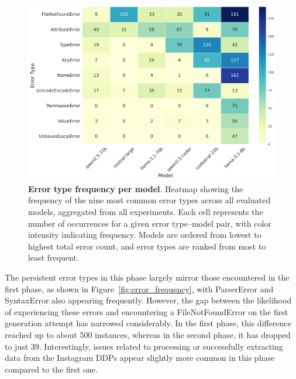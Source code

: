 \documentclass{DESSThesis}
\begin{document}
\begin{figure}[ht]
    \centering
    \includegraphics[width=0.80\linewidth]{img/Results/Second Experimental Phase/Error Type Frequency per Model.png}
    \caption[Error type frequency per model]{\textbf{Error type frequency per model}. Heatmap showing the frequency of the nine most common error types across all evaluated models, aggregated from all experiments. Each cell represents the number of occurrences for a given error type–model pair, with color intensity indicating frequency. Models are ordered from lowest to highest total error count, and error types are ranked from most to least frequent.}
    \label{fig:error_frequency_second}
\end{figure}

The persistent error types in this phase largely mirror those encountered in the first phase, as shown in Figure~\ref{fig:error_frequency}, with ParserError and SyntaxError also appearing frequently. However, the gap between the likelihood of experiencing these errors and encountering a FileNotFoundError on the first generation attempt has narrowed considerably. In the first phase, this difference reached up to about 500 instances, whereas in the second phase, it has dropped to just 39. Interestingly, issues related to processing or successfully extracting data from the Instagram DDPs appear slightly more common in this phase compared to the first one.
\end{document}
